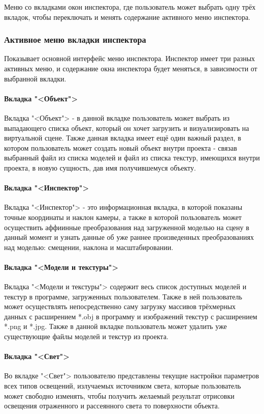 Меню со вкладками окон инспектора, где пользователь может выбрать одну трёх вкладок, чтобы переключать и менять содержание активного меню инспектора.

\subsubsection{Активное меню вкладки инспектора}

Показывает основной интерфейс меню инспектора. Инспектор имеет три разных активных меню, и содержание окна инспектора будет меняться, в зависимости от выбранной вкладки.

\paragraph{Вкладка "<Объект">}
Вкладка "<Объект"> - в данной вкладке пользователь может выбрать из выпадающего списка объект, который он хочет загрузить и визуализировать на виртуальной сцене. Также данная вкладка имеет ещё один важный раздел, в котором пользователь может создать новый объект внутри проекта - связав выбранный файл из списка моделей и файл из списка текстур, имеющихся внутри проекта, в новую сущность, дав имя получившемуся объекту.

\paragraph{Вкладка "<Инспектор">}
Вкладка "<Инспектор"> - это информационная вкладка, в которой показаны точные координаты и наклон камеры, а также в которой пользователь может осуществить аффиинные преобразования над загруженной моделью на сцену в данный момент и узнать данные об уже раннее произведенных преобразованиях над моделью: смещении, наклона и масштабировании.

\paragraph{Вкладка "<Модели и текстуры">}
Вкладка "<Модели и текстуры"> содержит весь список доступных моделей и текстур в программе, загруженных пользователем. Также в ней пользователь может осуществлять непосредственно саму загрузку массивов трёхмерных данных с расширением *.obj в программу и изображений текстур с расширением *.png и *.jpg. Также в данной вкладке пользователь может удалить уже существующие файлы моделей и текстур из проекта.

\paragraph{Вкладка "<Свет">}
Во вкладке "<Свет"> пользователю представлены текущие настройки параметров всех типов освещений, излучаемых источником света, которые пользователь может свободно изменять, чтобы получить желаемый результат отрисовки освещения отраженного и рассеянного света то поверхности объекта.